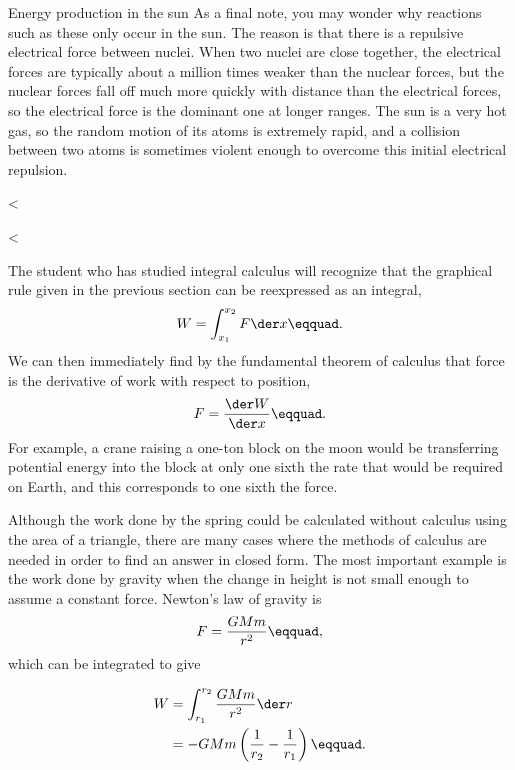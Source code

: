 \begin{eg}{Energy production in the sun}
As a final note, you may wonder why reactions such as these
only occur in the sun. The reason is that there is a
repulsive electrical force between nuclei. When two nuclei
are close together, the electrical forces are typically
about a million times weaker than the nuclear forces, but
the nuclear forces fall off much more quickly with distance
than the electrical forces, so the electrical force is the
dominant one at longer ranges. The sun is a very hot gas, so
the random motion of its atoms is extremely rapid, and a
collision between two atoms is sometimes violent enough to
overcome this initial electrical repulsion.
\end{eg}

<%

<%

The student who has studied integral calculus will recognize
that the graphical rule given in the previous section can be
reexpressed as an integral,
\begin{equation*}
 W = \int_{x_1}^{x_2}F \der x\eqquad.
\end{equation*}
We can then immediately find by the fundamental theorem of
calculus that force is the derivative of work with
respect to position,
\begin{equation*}
 F = \frac{\der W}{\der x}\eqquad.
\end{equation*}
For example, a crane raising a one-ton block on the moon
would be transferring potential energy into the block at
only one sixth the rate that would be required on Earth, and
this corresponds to one sixth the force.

Although the work done by the spring could be calculated
without calculus using the area of a triangle, there are
many cases where the methods of calculus are needed in order
to find an answer in closed form. The most important example
is the work done by gravity when the change in height is not
small enough to assume a constant force. Newton's law of gravity is
\begin{equation*}
 F = \frac{GMm}{r^2}\eqquad,
\end{equation*}
which can be integrated to give

\begin{align*}
 W &= \int_{r_1}^{r_2} \frac{GMm}{r^2} \der r\\
 &= -GMm\left(\frac{1}{r_2}-\frac{1}{r_1}\right)\eqquad.
\end{align*}

